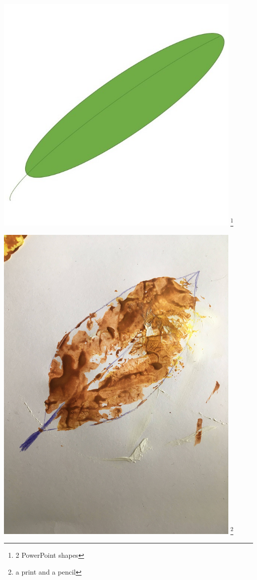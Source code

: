 \documentclass[12pt, a4paper]{article}
\begin{document}
\includegraphics[width=0.9\textwidth,height=\textheight,keepaspectratio]{leaf-powerpoint2shapes.jpg}
\footnote{2 PowerPoint shapes}
\newpage

\includegraphics[width=0.9\textwidth,height=\textheight,keepaspectratio]{leaf-print-and-pencil.jpg}
\footnote{a print and a pencil}
\newpage
\end{document}
